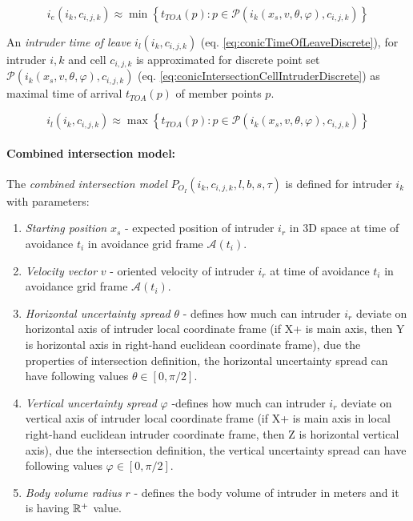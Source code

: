 \begin{equation}\label{eq:conicTimeOfEntryDiscrete}
    i_e(i_k,c_{i,j,k})\approx \min \left\{t_{TOA}({p}):{p}\in\mathscr{P}(i_k({x}_s,{v},\theta,\varphi),c_{i,j,k})\right\}
\end{equation}

\noindent An \emph{intruder time of leave} $i_l(i_k,c_{i,j,k})$ (eq. \ref{eq:conicTimeOfLeaveDiscrete}), for intruder $i,k$ and cell $c_{i,j,k}$ is approximated for discrete point set  $\mathscr{P}(i_k({x}_s,{v},\theta,\varphi),c_{i,j,k})$ (eq. \ref{eq:conicIntersectionCellIntruderDiscrete}) as maximal time of arrival $t_{TOA}({p})$ of member points ${p}$.

\begin{equation}\label{eq:conicTimeOfLeaveDiscrete}
    i_l(i_k,c_{i,j,k})\approx \max \left\{t_{TOA}({p}):{p}\in\mathscr{P}(i_k({x}_s,{v},\theta,\varphi),c_{i,j,k})\right\}
\end{equation}

\paragraph{Combined intersection model:} The \emph{combined intersection model} $P_{O_I}(i_k,c_{i,j,k},l,b,s,\tau)$ is defined for intruder $i_k$ with parameters:

\begin{enumerate}
    \item\textit{Starting position} ${x}_s$ - expected position of intruder $i_r$ in 3D space at time of avoidance $t_i$ in avoidance grid frame $\mathscr{A}(t_i)$.
    
    \item\textit{Velocity vector} ${v}$ - oriented velocity of intruder $i_r$ at time of avoidance $t_i$ in avoidance grid frame $\mathscr{A}(t_i)$. 
    
    \item\textit{Horizontal uncertainty spread} $\theta$ - defines how much can intruder $i_r$ deviate on horizontal axis of intruder local coordinate frame (if X+ is main axis, then Y is horizontal axis in right-hand euclidean coordinate frame), due the properties of intersection definition, the horizontal uncertainty spread can have following values $\theta\in[0,\pi/2]$.
    
    \item\textit{Vertical uncertainty spread} $\varphi$ -defines how much can intruder $i_r$ deviate on vertical axis of intruder local coordinate frame (if X+ is main axis in local right-hand euclidean intruder coordinate frame, then Z is horizontal vertical axis), due the intersection definition, the vertical uncertainty spread can have following values $\varphi\in[0,\pi/2]$.
    
    \item\textit{Body volume radius} $r$ - defines the body volume of intruder in meters and it is having  $\mathbb{R}^+$  value.
\end{enumerate}

